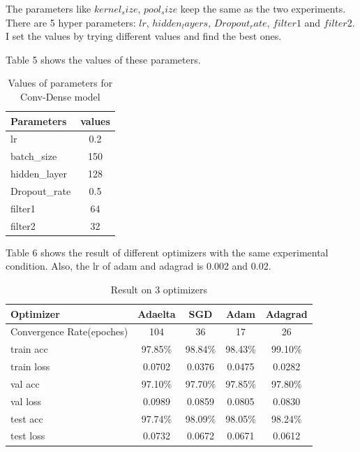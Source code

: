 \documentclass{article}
\begin{document}
The parameters like $kernel_size$, $pool_size$ keep the same as the two experiments. There are 5 hyper parameters: $lr$, $hidden_layers$, $Dropout_rate$, $filter1$ and $filter2$. I set the values by trying different values and find the best ones.

Table 5 shows the values of these parameters.

\begin{table}[htbp]
    \caption{Values of parameters for Conv-Dense model}
    \centering
    \begin{tabular}{|l|c|}
    \hline
         Parameters & values \\ \hline
         lr & 0.2 \\
         batch\_size & 150 \\
         hidden\_layer & 128  \\
         Dropout\_rate & 0.5 \\
         filter1 & 64 \\
         filter2 & 32\\
         \hline
    \end{tabular}
    \label{table5}
\end{table}

Table 6 shows the result of different optimizers with the same experimental condition. Also, the lr of adam and adagrad is 0.002 and 0.02.

\begin{table}[ht]
    \caption{Result on 3 optimizers}
    \centering
    \begin{tabular}{|l|c|c|c|c|}
    \hline
         Optimizer  & Adaelta & SGD & Adam & Adagrad\\ \hline
         Convergence Rate(epoches) &  104 & 36 & 17 &  26\\ \hline
         train acc & 97.85\% & 98.84\% & 98.43\% & 99.10\% \\
         train loss & 0.0702 & 0.0376 & 0.0475 & 0.0282\\ \hline
         val acc & 97.10\% & 97.70\% & 97.85\% & 97.80\% \\
         val loss & 0.0989 & 0.0859 & 0.0805 & 0.0830 \\ \hline
         test acc & 97.74\% & 98.09\% & 98.05\% & 98.24\%\\
         test loss & 0.0732 & 0.0672 & 0.0671 & 0.0612\\ \hline
    \end{tabular}
    \label{table6}
\end{table}
\end{document}
